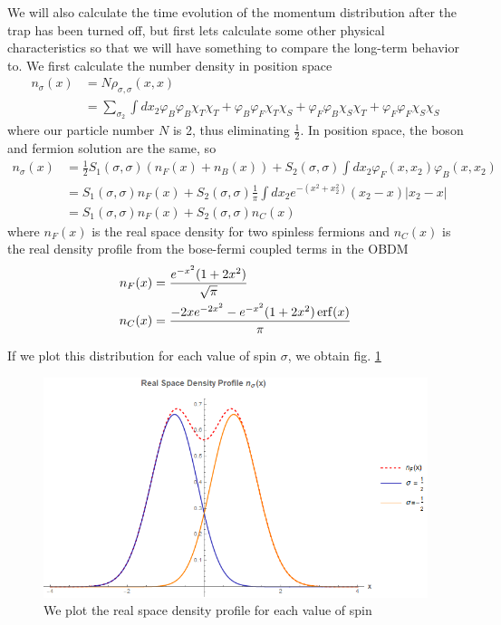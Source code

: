 \documentclass[onecolumn,english,aps,pra]{revtex4}
\begin{document}
We will also calculate the time evolution of the momentum distribution after the trap has been turned off, but first lets calculate some other physical characteristics so that we will have something to compare the long-term behavior to. We first calculate the number density in position space
\begin{align}
n_{\sigma}(x) & = N \rho_{\sigma, \sigma}(x,x)\\
& = \sum_{\sigma_2} \int dx_2 
\varphi_B\varphi_B\chi_T\chi_T
+ \varphi_B\varphi_F\chi_T\chi_S
+ \varphi_F\varphi_B\chi_S\chi_T
+ \varphi_F\varphi_F\chi_S\chi_S \nonumber
\end{align}
where our particle number $N$ is 2, thus eliminating $\frac{1}{2}$. In position space, the boson and fermion solution are the same, so
\begin{align}
n_{\sigma}(x) & = \frac{1}{2}S_1(\sigma, \sigma)(n_F(x) + n_B(x)) + S_2(\sigma,\sigma) \int dx_2 \varphi_F(x,x_2)\varphi_B(x,x_2)\nonumber\\
&= S_1(\sigma, \sigma)n_F(x) + S_2(\sigma,\sigma) \frac{1}{\pi} \int dx_2 e^{-(x^2 + x_2^2)} (x_2 -x ) |x_2 - x| \nonumber\\
&= S_1(\sigma, \sigma)n_F(x) + S_2(\sigma,\sigma) n_C(x)
\end{align}
where $n_F(x)$ is the real space density for two spinless fermions and $n_C(x)$ is the real density profile from the bose-fermi coupled 	terms in the OBDM
\begin{align}
n_F(x) &= \frac{e^{-x^2}(1+2x^2)}{\sqrt{\pi}}\\
n_C(x) &= \frac{-2x e^{-2x^2} - e^{-x^2} (1+2x^2) \erf(x)}{\pi}
\label{ncRSDP}
\end{align}

If we plot this distribution for each value of spin $\sigma$, we obtain fig. \ref{fig:PositionDist}

\begin{figure}
\includegraphics[scale=0.6]{"../Plots/RSpaceDProfileMixedSpinor"}
\caption{We plot the real space density profile for each value of spin}
\label{fig:PositionDist}
\end{figure}
\end{document}
